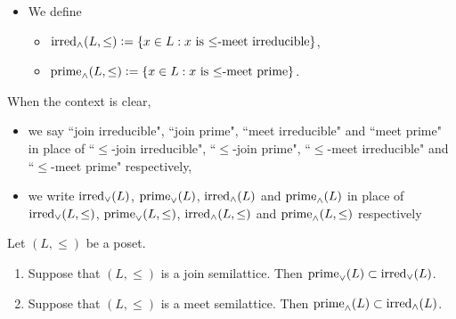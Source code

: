 \documentclass{book}
\begin{document}
\begin{defn}
\begin{itemize}
\begin{itemize}
\begin{itemize}
\begin{enumerate}
						\item $x \neq 1$,
						\item for each $a,b \in L$, $a \wedge_{\leq} b \leq x$ implies that $a \leq x$ or $b \leq x$.
					\end{enumerate}
				\end{itemize}
				\item We define 
				\begin{itemize}
					\item $\operatorname*{\text{irred}_{\wedge}}(L, \leq) \vcentcolon= \{x \in L: \text{$x$ is $\leq$-meet irreducible}\}$,
					\item $\operatorname*{\text{prime}_{\wedge}}(L, \leq) \vcentcolon= \{x \in L: \text{$x$ is $\leq$-meet prime}\}$.
				\end{itemize}
			\end{itemize}
		\end{itemize}
	\end{defn}
	
	\begin{note}
		When the context is clear, 
		\begin{itemize}
			\item we say ``join irreducible", ``join prime", ``meet irreducible" and ``meet prime" in place of ``$\leq$-join irreducible", ``$\leq$-join prime", ``$\leq$-meet irreducible" and ``$\leq$-meet prime" respectively,
			\item we write $\operatorname*{\text{irred}_{\vee}}(L)$, $\operatorname*{\text{prime}_{\vee}}(L)$, $\operatorname*{\text{irred}_{\wedge}}(L)$ and $\operatorname*{\text{prime}_{\wedge}}(L)$ in place of $\operatorname*{\text{irred}_{\vee}}(L, \leq)$, $\operatorname*{\text{prime}_{\vee}}(L, \leq)$, $\operatorname*{\text{irred}_{\wedge}}(L, \leq)$ and $\operatorname*{\text{prime}_{\wedge}}(L, \leq)$ respectively
		\end{itemize}
	\end{note}
	
	\begin{ex}
		Let $(L, \leq)$ be a poset. 
		\begin{enumerate}
			\item Suppose that $(L, \leq)$ is a join semilattice. Then $\operatorname*{\text{prime}_{\vee}}(L) \subset \operatorname*{\text{irred}_{\vee}}(L)$. 
			\item Suppose that $(L, \leq)$ is a meet semilattice. Then $\operatorname*{\text{prime}_{\wedge}}(L) \subset \operatorname*{\text{irred}_{\wedge}}(L)$. 
		\end{enumerate}
	\end{ex}
	
\end{document}
